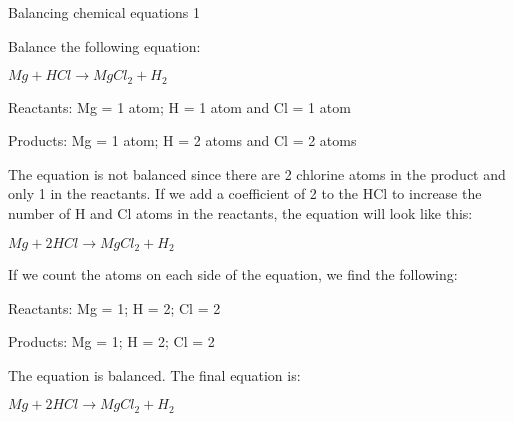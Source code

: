\begin{wex}{Balancing chemical equations 1}{Balance the following equation:
\begin{center}
\rm${Mg + HCl \rightarrow MgCl_{2} + H_{2}}$\\
\end{center}
}

{

Reactants: Mg = 1 atom; H = 1 atom and Cl = 1 atom

Products: Mg = 1 atom; H = 2 atoms and Cl = 2 atoms\\}

{
The equation is not balanced since there are 2 chlorine atoms in the product and only 1 in the reactants. If we add a coefficient of 2 to the HCl to increase the number of H and Cl atoms in the reactants, the equation will look like this:
\begin{center}
\rm${Mg + 2HCl \rightarrow MgCl_{2} + H_{2}}$\\
\end{center}
}

{
If we count the atoms on each side of the equation, we find the following:

Reactants: Mg = 1; H = 2; Cl = 2

Products: Mg = 1; H = 2; Cl = 2

The equation is balanced. The final equation is:
\begin{center}
\rm${Mg + 2HCl \rightarrow MgCl_{2} + H_{2}}$
\end{center}
}
\end{wex}

